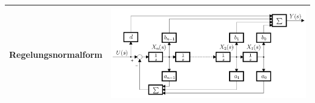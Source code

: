 \begin{center}
\begin{tabu}{|p{0.25\textwidth}|p{0.7\textwidth}|}
	\hline
	\vspace*{-0.5cm}Regelungsnormalform 
		& \includegraphics[width = \linewidth, height = 4cm, trim = 0 0 0 -5]{./images/regelungsnormalform}\vspace*{-0.5cm}\\[2mm]
	\hline
	\end{tabu}
\end{center}
\clearpage
